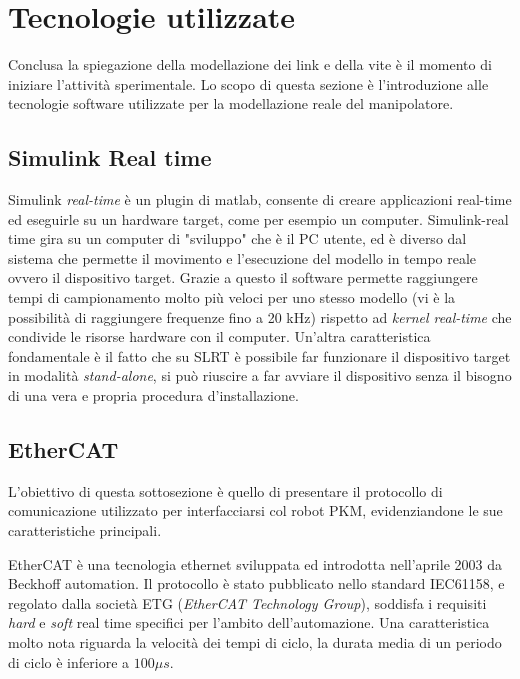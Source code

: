 \section{Tecnologie utilizzate}
Conclusa la spiegazione della modellazione dei link e della vite è il momento di iniziare l'attività sperimentale. Lo scopo di questa sezione è l'introduzione alle tecnologie software utilizzate per la modellazione reale del manipolatore.
\subsection{Simulink Real time}
Simulink \textit{real-time} è un plugin di matlab, consente di creare applicazioni real-time ed eseguirle su un hardware target, come per esempio un computer. Simulink-real time gira su un computer di "sviluppo" che è il PC utente, ed è diverso dal sistema che permette il movimento e l'esecuzione del modello in tempo reale ovvero il dispositivo target. Grazie a questo il software permette raggiungere tempi di campionamento molto più veloci per uno stesso modello (vi è la possibilità di raggiungere frequenze fino a 20 kHz) rispetto ad \textit{kernel real-time} che condivide le risorse hardware con il computer.
Un'altra caratteristica fondamentale è il fatto che su SLRT è possibile far funzionare il dispositivo target in modalità \textit{stand-alone}, si può riuscire a far avviare il dispositivo senza il bisogno di una vera e propria procedura d'installazione.

\subsection{EtherCAT}
L'obiettivo di questa sottosezione è quello di presentare il protocollo di comunicazione utilizzato per interfacciarsi col robot PKM, evidenziandone le sue caratteristiche principali.
\par EtherCAT è una tecnologia ethernet sviluppata ed introdotta nell'aprile 2003 da Beckhoff automation. Il protocollo è stato pubblicato nello standard IEC61158, e regolato dalla società ETG (\textit{EtherCAT Technology Group}), soddisfa i requisiti \textit{hard} e \textit{soft} real time specifici per l'ambito dell'automazione. Una caratteristica molto nota riguarda la velocità dei tempi di ciclo, la durata media di un periodo di ciclo è inferiore a $100 \mu s$. 
